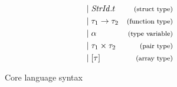 \begin{figure}[htb]
\begin{align*}
\begin{aligned}
&| \; \mathit{StrId}.t                &\footnotesize\text{(struct type)}\\
&| \; \tau_{1} \rightarrow \tau_{2}  & \footnotesize\text{(function type)}\\
&| \; \alpha                         & \footnotesize\text{(type variable)}\\
&| \; \tau_{1} \times \tau_{2}       & \footnotesize\text{(pair type)}\\
&| \; [\tau]                         & \footnotesize\text{(array type)}\\
\end{aligned}
\end{align*}
\caption{Core language syntax\label{fig:CoreSyntax}}
\end{figure}
